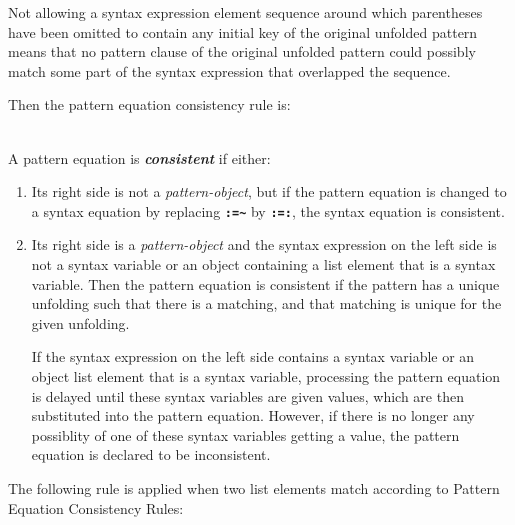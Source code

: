 \documentclass[12pt]{article}
\newcommand{\TT}[1]{{\tt \bfseries #1}}
\newcommand{\key}[1]{{\bf \em #1}\index{#1}}
\newcommand{\ikey}[2]{{\bf \em #1}\index{#2}}
\newcommand{\TILDE}{\textasciitilde}
\newenvironment{indpar}[1][0.3in]%
	{\begin{list}{}%
		     {\setlength{\itemsep}{0in}%
		      \setlength{\topsep}{0in}%
		      \setlength{\parsep}{1ex}%
		      \setlength{\labelwidth}{#1}%
		      \setlength{\leftmargin}{#1}%
		      \addtolength{\leftmargin}{\labelsep}}%
	 \item}%
	{\end{list}}
\begin{document}
\begin{indpar}
\begin{list}{}{}
\begin{enumerate}
\medskip

Not allowing a syntax expression element
sequence around which parentheses have been omitted
to contain any initial key of the original unfolded pattern means
that no pattern clause of the original unfolded pattern could
possibly match some part of the syntax expression that overlapped
the sequence.

\end{enumerate}

\end{list}
\end{indpar}

Then the pattern equation consistency rule is:

\begin{indpar}
\begin{list}{}{}
\item[\ikey{Pattern Equation Consistency Rule}%
           {pattern equation!consistency rule}:] ~\\
A pattern equation is \key{consistent} if either:
\begin{enumerate}
\item
Its right side is not a {\em pattern-object}, but if the
pattern equation is changed to a syntax equation by
replacing \TT{:=\TILDE} by \TT{:=:}, the syntax equation is consistent.
\item
Its right
side is a {\em pattern-object} and
the syntax expression on the left side is not a syntax
variable or an object containing a list element that is
a syntax variable.  Then the pattern equation is consistent if
the pattern has a unique unfolding such that there is a matching,
and that matching is unique for the given unfolding.

\medskip

If the syntax expression on the left side contains a syntax
variable or an object list element that is a syntax variable,
processing the pattern equation is delayed until these
syntax variables are given values, which are then substituted
into the pattern equation.  However, if there is no longer
any possiblity of one of these syntax variables getting a value,
the pattern equation is declared to be inconsistent.

\end{enumerate}

\end{list}
\end{indpar}

The following rule is applied when two list elements match according
to Pattern Equation Consistency Rules:
\end{document}
